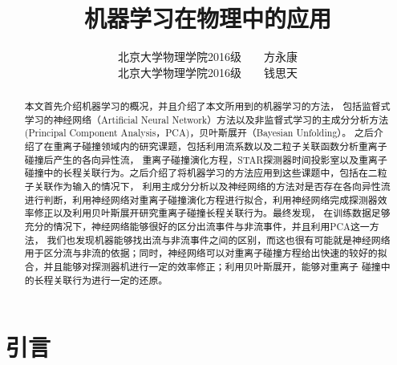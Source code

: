 \documentclass[aps,pre,12pt,preprint,onecolumn,showpacs,showkeys]{revtex4-1}
\begin{document}
\title{\songti{}\bf{机器学习在物理中的应用}\vspace{15mm}}
\author{\songti{}北京大学物理学院2016级~~~~方永康\vspace{2mm}\\
\songti{}北京大学物理学院2016级~~~~钱思天\vspace{2mm}}

\begin{abstract}
\vspace{10mm}
\begin{spacing}{1.5}
\songti{}
本文首先介绍机器学习的概况，并且介绍了本文所用到的机器学习的方法，
包括监督式学习的神经网络（Artificial Neural Network）方法以及非监督式学习的主成分分析方法(Principal Component Analysis，PCA)，贝叶斯展开（Bayesian Unfolding）。
之后介绍了在重离子碰撞领域内的研究课题，包括利用流系数以及二粒子关联函数分析重离子碰撞后产生的各向异性流，
重离子碰撞演化方程，STAR探测器时间投影室以及重离子碰撞中的长程关联行为。之后介绍了将机器学习的方法应用到这些课题中，包括在二粒子关联作为输入的情况下，
利用主成分分析以及神经网络的方法对是否存在各向异性流进行判断，利用神经网络对重离子碰撞演化方程进行拟合，利用神经网络完成探测器效率修正以及利用贝叶斯展开研究重离子碰撞长程关联行为。最终发现，
在训练数据足够充分的情况下，神经网络能够很好的区分出流事件与非流事件，并且利用PCA这一方法，
我们也发现机器能够找出流与非流事件之间的区别，而这也很有可能就是神经网络用于区分流与非流的依据；同时，神经网络可以对重离子碰撞方程给出快速的较好的拟合，并且能够对探测器机进行一定的效率修正；利用贝叶斯展开，能够对重离子
碰撞中的长程关联行为进行一定的还原。
\end{spacing}
\end{abstract}
\maketitle


\section{引言}
\end{document}

